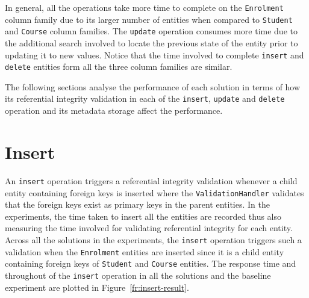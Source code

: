 	
	
% 	

	In general, all the operations take more time to complete on the
	\texttt{Enrolment} column family due to its larger number of entities 
	when compared to \texttt{Student} and \texttt{Course} column families. The
	\texttt{update} operation consumes more time due to the additional search
	involved to locate the previous state of the entity prior to updating it to new
	values. Notice that the time involved to complete \texttt{insert} and
	\texttt{delete} entities form all the three column families are similar.
	
	The following sections analyse the performance of each solution  in
	terms of how its referential integrity validation in each of the
	\texttt{insert}, \texttt{update} and \texttt{delete} operation and its
	metadata storage affect the performance.
	
\section{Insert}\label{sr:insert}
An \texttt{insert} operation triggers a referential integrity validation
whenever a child entity containing foreign keys is inserted where the
\texttt{ValidationHandler} validates that the foreign keys exist as primary keys in the parent
entities. 
In the experiments, the time taken to insert all the
entities are recorded thus also measuring the time involved for validating
referential integrity for each entity. Across all the solutions in the
experiments, the \texttt{insert} operation triggers such a validation when the
\texttt{Enrolment} entities are inserted since it is a child entity containing
foreign keys of \texttt{Student} and \texttt{Course} entities.
The response time and throughout of the \texttt{insert} operation in all the
solutions and the baseline experiment are plotted in
Figure~\ref{fr:insert-result}.
	
